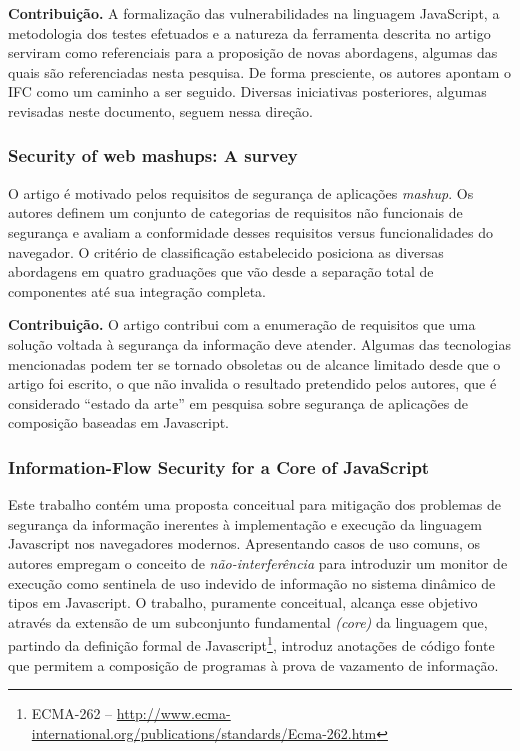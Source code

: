 \textbf{Contribuição.} A formalização das vulnerabilidades na linguagem JavaScript, a metodologia dos testes efetuados e a natureza da ferramenta descrita no artigo serviram como referenciais para a proposição de novas abordagens, algumas das quais são referenciadas nesta pesquisa. De forma presciente, os autores apontam o IFC como um caminho a ser seguido. Diversas iniciativas posteriores, algumas revisadas neste documento, seguem nessa direção.


\subsubsection{Security of web mashups: A survey \cite{DeRyck2012}}
O artigo é motivado pelos requisitos de segurança de aplicações \textit{mashup}. Os autores definem um conjunto de categorias de requisitos não funcionais de segurança e avaliam a conformidade desses requisitos versus funcionalidades do navegador. O critério de classificação estabelecido posiciona as diversas abordagens em quatro graduações que vão desde a separação total de componentes até sua integração completa.

\textbf{Contribuição.} O artigo contribui com a enumeração de requisitos que uma solução voltada à segurança da informação deve atender. Algumas das tecnologias mencionadas podem ter se tornado obsoletas ou de alcance limitado desde que o artigo foi escrito, o que não invalida o resultado pretendido pelos autores, que é considerado ``estado da arte''\cite{Hedin2014} em pesquisa sobre segurança de aplicações de composição baseadas em Javascript.


\subsubsection{Information-Flow Security for a Core of JavaScript \cite{Hedin2012}}
Este trabalho contém uma proposta conceitual para mitigação dos problemas de segurança da informação inerentes à implementação e execução da linguagem Javascript nos navegadores modernos. Apresentando casos de uso comuns, os autores empregam o conceito de \textit{não-interferência} para introduzir um monitor de execução como sentinela de uso indevido de informação no sistema dinâmico de tipos em Javascript. O trabalho, puramente conceitual, alcança esse objetivo através da extensão de um subconjunto fundamental \textit{(core)} da linguagem que, partindo da definição formal de Javascript\footnote{ECMA-262 -- \url{http://www.ecma-international.org/publications/standards/Ecma-262.htm}}, introduz anotações de código fonte que permitem a composição de programas à prova de vazamento de informação.

